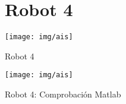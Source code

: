 \begin{figure}[h]
	\section{Robot 4} %
	\centering
	{%
		\texttt{[image: img/ais]}
		\caption{Robot 4} %
		\label{fig:robot41}
	}
\end{figure}
\begin{figure}[h]
	\centering
	{%
		\texttt{[image: img/ais]}
		\caption{Robot 4: Comprobación Matlab} %
		\label{fig:robot4}
	}
\end{figure}
